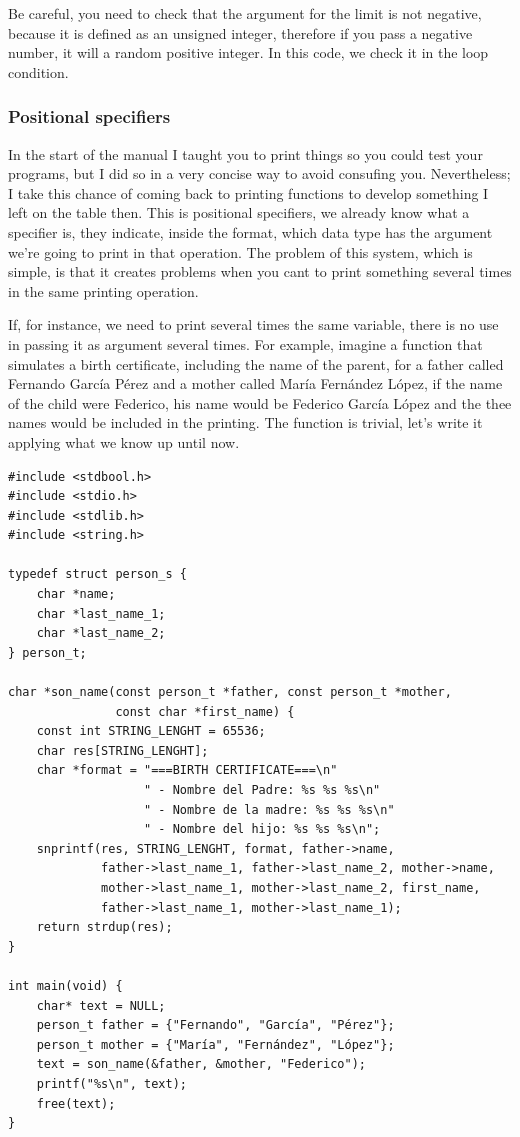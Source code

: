 \documentclass[a4paper]{article}
\begin{document}
Be careful, you need to check that the argument for the limit is not negative,
because it is defined as an unsigned integer, therefore if you pass a negative
number, it will a random positive integer. In this code, we check it in the
loop condition.

\subsubsection{Positional specifiers}
In the start of the manual I taught you to print things so you could test your
programs, but I did so in a very concise way to avoid consufing you.
Nevertheless; I take this chance of coming back to printing functions to
develop something I left on the table then. This is positional specifiers,
we already know what a specifier is, they indicate, inside the format, which
data type has the argument we're going to print in that operation. The problem
of this system, which is simple, is that it creates problems when you cant to
print something several times in the same printing operation.

If, for instance, we need to print several times the same variable, there is
no use in passing it as argument several times. For example, imagine a function
that simulates a birth certificate, including the name of the parent, for a
father called Fernando García Pérez and a mother called María Fernández López,
if the name of the child were Federico, his name would be Federico García López
and the thee names would be included in the printing. The function is trivial,
let's write it applying what we know up until now.

\noindent
\begin{minipage}[H]{\linewidth}
\mbox{}
\begin{lstlisting}[style=C,
caption={Example of printing with repeated argument},
label={lst:repeatedMessages}]
#include <stdbool.h>
#include <stdio.h>
#include <stdlib.h>
#include <string.h>

typedef struct person_s {
    char *name;
    char *last_name_1;
    char *last_name_2;
} person_t;

char *son_name(const person_t *father, const person_t *mother,
               const char *first_name) {
    const int STRING_LENGHT = 65536;
    char res[STRING_LENGHT];
    char *format = "===BIRTH CERTIFICATE===\n"
                   " - Nombre del Padre: %s %s %s\n"
                   " - Nombre de la madre: %s %s %s\n"
                   " - Nombre del hijo: %s %s %s\n";
    snprintf(res, STRING_LENGHT, format, father->name,
             father->last_name_1, father->last_name_2, mother->name,
             mother->last_name_1, mother->last_name_2, first_name,
             father->last_name_1, mother->last_name_1);
    return strdup(res);
}

int main(void) {
    char* text = NULL;
    person_t father = {"Fernando", "García", "Pérez"};
    person_t mother = {"María", "Fernández", "López"};
    text = son_name(&father, &mother, "Federico");
    printf("%s\n", text);
    free(text);
}
\end{lstlisting}
\end{minipage}
\end{document}
